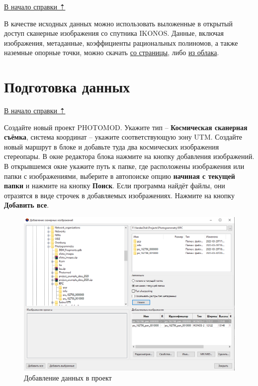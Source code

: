 \documentclass[
  12pt,
]{book}
\begin{document}
\protect\hyperlink{rpc}{В начало справки ⇡}

В качестве исходных данных можно использовать выложенные в открытый доступ сканерные изображения со спутника IKONOS. Данные, включая изображения, метаданные, коэффициенты рациональных полиномов, а также наземные опорные точки, можно скачать \href{https://www.isprs.org/data/ikonos_hobart/default.aspx}{со страницы}, либо \href{https://disk.yandex.ru/d/N2cDLX4j3GryPg}{из облака}.

\hypertarget{rpc-prepare}{%
\section{Подготовка данных}\label{rpc-prepare}}

\protect\hyperlink{rpc}{В начало справки ⇡}

Создайте новый проект PHOTOMOD. Укажите тип -- \textbf{Космическая сканерная съёмка}, система координат -- укажите соответствующую зону UTM. Создайте новый маршрут в блоке и добавьте туда два космических изображения стереопары. В окне редактора блока нажмите на кнопку добавления изображений. В открывшемся окне укажите путь к папке, где расположены изображения или папки с изображениями, выберите в автопоиске опцию \textbf{начиная с текущей папки} и нажмите на кнопку \textbf{Поиск}. Если программа найдёт файлы, они отразятся в виде строчек в добавляемых изображениях. Нажмите на кнопку \textbf{Добавить все}.

\begin{figure}
\centering
\includegraphics{images/Ref17/Adding_Imagery.png}
\caption{Добавление данных в проект}
\end{figure}
\end{document}
